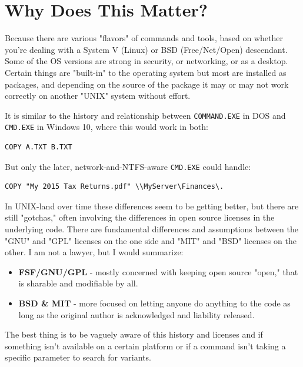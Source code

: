 \documentclass[10pt,]{book}
\numberwithin{figure}{chapter}
\DeclareRobustCommand{\drshl}[1]{\index{Shells!#1}}
\begin{document}
\section*{Why Does This Matter?}\label{why-does-this-matter}

Because there are various "flavors" of commands and tools, based on
whether you're dealing with a System V (Linux) or BSD (Free/Net/Open)
descendant. Some of the OS versions are strong in security, or
networking, or as a desktop. Certain things are "built-in" to the
operating system but most are installed as packages, and depending on
the source of the package it may or may not work correctly on another
"UNIX" system without effort.

It is similar to the history and relationship between
\texttt{COMMAND.EXE}\drshl{COMMAND.EXE} in DOS and
\texttt{CMD.EXE}\drshl{CMD.EXE} in Windows 10, where this would work in
both:

\begin{verbatim}
COPY A.TXT B.TXT
\end{verbatim}

But only the later, network-and-NTFS-aware \texttt{CMD.EXE} could
handle:

\begin{verbatim}
COPY "My 2015 Tax Returns.pdf" \\MyServer\Finances\.
\end{verbatim}

In UNIX-land over time these differences seem to be getting better, but
there are still "gotchas," often involving the differences in open
source licenses in the underlying code. There are fundamental
differences and assumptions between the "GNU" and "GPL" licenses on the
one side and "MIT" and "BSD" licenses on the other. I am not a lawyer,
but I would summarize:

\begin{itemize}
\item
  \textbf{FSF/GNU/GPL} - mostly concerned with keeping open source
  "open," that is sharable and modifiable by all.
\item
  \textbf{BSD \& MIT} - more focused on letting anyone do anything to
  the code as long as the original author is acknowledged and liability
  released.
\end{itemize}

The best thing is to be vaguely aware of this history and licenses and
if something isn't available on a certain platform or if a command isn't
taking a specific parameter to search for variants.
\end{document}
